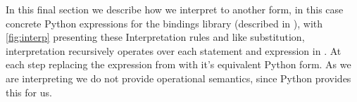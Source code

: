In this final section we describe how we interpret \thePolicyLang to another form, in this case concrete Python expressions for the \PyOpenABE bindings library (described in ), with \cref{fig:interp} presenting these Interpretation rules and like substitution, interpretation recursively operates over each statement and expression in \thePolicyLang. At each step replacing the expression from \thePolicyLang with it's equivalent Python form. As we are interpreting \thePolicyLang we do not provide operational semantics, since Python provides this for us.
